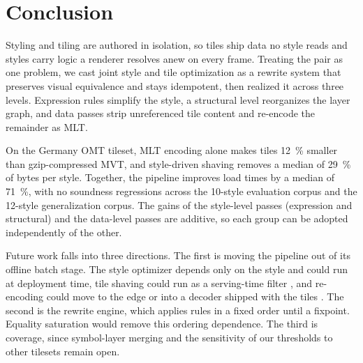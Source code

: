 
\section{Conclusion}\label{sec:conclusion}

Styling and tiling are authored in isolation, so tiles ship data no style reads and styles carry logic a renderer resolves anew on every frame.
Treating the pair as one problem, we cast joint style and tile optimization as a rewrite system that preserves visual equivalence and stays idempotent, then realized it across three levels.
Expression rules simplify the style, a structural level reorganizes the layer graph, and data passes strip unreferenced tile content and re-encode the remainder as \ac{MLT}.

On the Germany \ac{OMT} tileset, \ac{MLT} encoding alone makes tiles \qty{12}{\percent} smaller than gzip-compressed \ac{MVT}, and style-driven shaving removes a median of \qty{29}{\percent} of bytes per style.
Together, the pipeline improves load times by a median of \qty{71}{\percent}, with no soundness regressions across the 10-style evaluation corpus and the 12-style generalization corpus.
The gains of the style-level passes (expression and structural) and the data-level passes are additive, so each group can be adopted independently of the other.

Future work falls into three directions.
The first is moving the pipeline out of its offline batch stage.
The style optimizer depends only on the style and could run at deployment time, tile shaving could run as a serving-time filter \citep{deshpandeAdaptiveQueryProcessing2006}, and re-encoding could move to the edge or into a decoder shipped with the tiles \citep{gienieczkoAnyBloxFrameworkSelfDecoding2025}.
The second is the rewrite engine, which applies rules in a fixed order until a fixpoint.
Equality saturation \citep{tateEqualitySaturationNew2009,willseyEggFastExtensible2021} would remove this ordering dependence.
The third is coverage, since symbol-layer merging and the sensitivity of our thresholds to other tilesets remain open.
